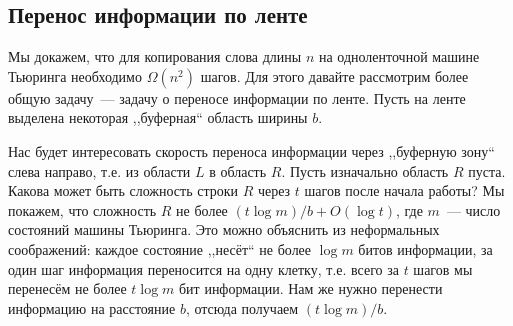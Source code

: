 \documentclass[12pt]{article}
\theoremstyle{definition}
\theoremstyle{plain}
\theoremstyle{remark}
\begin{document}
\subsection{Перенос информации по ленте}
Мы докажем, что для копирования слова длины $n$ на одноленточной машине Тьюринга
необходимо $\Omega(n^2)$ шагов. Для этого давайте рассмотрим более общую задачу~—
задачу о переносе информации по ленте. Пусть на ленте выделена некоторая ,,буферная``
область ширины $b$.
\begin{center}
\end{center}
Нас будет интересовать скорость переноса информации через ,,буферную зону`` слева направо,
т.е. из области $L$ в область $R$. Пусть изначально область $R$ пуста. Какова может быть
сложность строки $R$ через $t$ шагов после начала работы? Мы покажем, что сложность $R$
не более $(t\log m)/b + O(\log t)$, где $m$~--- число состояний машины Тьюринга. Это
можно объяснить из неформальных соображений: каждое состояние ,,несёт`` не более $\log m$
битов информации, за один шаг информация переносится на одну клетку, т.е. всего за $t$
шагов мы перенесём не более $t\log m$ бит информации. Нам же нужно перенести информацию
на расстояние $b$, отсюда получаем $(t\log m) / b$.
\end{document}
